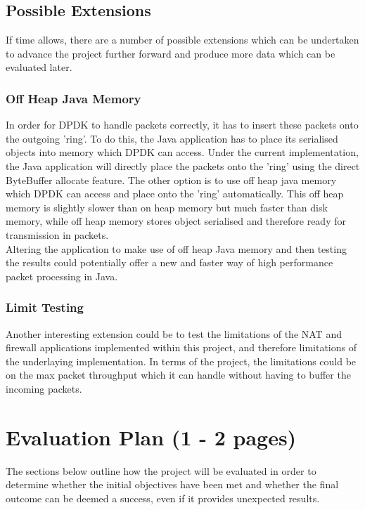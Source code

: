 \documentclass[a4paper, titlepage]{article}
\begin{document}
\subsection{Possible Extensions}
If time allows, there are a number of possible extensions which can be undertaken to advance the project further forward and produce more data which can be evaluated later.

\subsubsection{Off Heap Java Memory}
In order for DPDK to handle packets correctly, it has to insert these packets onto the outgoing 'ring'. To do this, the Java application has to place its serialised objects into memory which DPDK can access. Under the current implementation, the Java application will directly place the packets onto the 'ring' using the direct ByteBuffer allocate feature. The other option is to use off heap java memory which DPDK can access and place onto the 'ring' automatically. This off heap memory is slightly slower than on heap memory but much faster than disk memory, while off heap memory stores object serialised and therefore ready for transmission in packets. \\
\newline
Altering the application to make use of off heap Java memory and then testing the results could potentially offer a new and faster way of high performance packet processing in Java.

\subsubsection{Limit Testing}
Another interesting extension could be to test the limitations of the NAT and firewall applications implemented within this project, and therefore limitations of the underlaying implementation. In terms of the project, the limitations could be on the max packet throughput which it can handle without having to buffer the incoming packets.

\newpage

\section{Evaluation Plan (1 - 2 pages)}
The sections below outline how the project will be evaluated in order to determine whether the initial objectives have been met and whether the final outcome can be deemed a success, even if it provides unexpected results.
\end{document}
